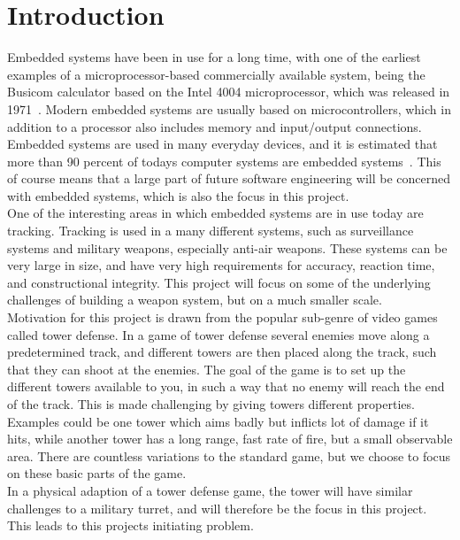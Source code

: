 \chapter{Introduction}\label{ch:introduction}\label{\automlabel}
Embedded systems have been in use for a long time, with one of the earliest examples of a microprocessor-based commercially available system, being the Busicom  calculator based on the Intel 4004 microprocessor, which was released in 1971~\cite{intel4004}. Modern embedded systems are usually based on microcontrollers, which in addition to a processor also includes memory and input/output connections. Embedded systems are used in many everyday devices, and it is estimated that more than 90 percent of todays computer systems are embedded systems~\cite{embedded_nd}. This of course means that a large part of future software engineering will be concerned with embedded systems, which is also the focus in this project.\\

One of the interesting areas in which embedded systems are in use today are tracking. Tracking is used in a many different systems, such as surveillance systems and military weapons, especially anti-air weapons. These systems can be very large in size, and have very high requirements for accuracy, reaction time, and constructional integrity. This project will focus on some of the underlying challenges of building a weapon system, but on a much smaller scale.\\

Motivation for this project is drawn from the popular sub-genre of video games called tower defense. In a game of tower defense several enemies move along a predetermined track, and different towers are then placed along the track, such that they can shoot at the enemies. The goal of the game is to set up the different towers available to you, in such a way that no enemy will reach the end of the track. This is made challenging by giving towers different properties. Examples could be one tower which aims badly but inflicts lot of damage if it hits, while another tower has a long range, fast rate of fire, but a small observable area. There are countless variations to the standard game, but we choose to focus on these basic parts of the game.\\

In a physical adaption of a tower defense game, the tower will have similar challenges to a military turret, and will therefore be the focus in this project. This leads to this projects initiating problem.\\

